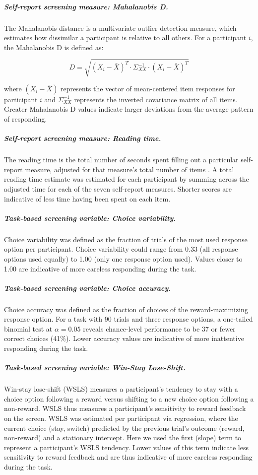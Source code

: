 \documentclass[a4paper,notitlepage,12pt]{article}
\begin{document}
\subparagraph{Self-report screening measure: Mahalanobis D.} The Mahalanobis distance is a multivariate outlier detection measure, which estimates how dissimilar a participant is relative to all others. For a participant $i$, the Mahalanobis D is defined as:

\begin{equation*}
    D = \sqrt{(X_i - \bar{X})^T \cdot \Sigma^{-1}_{XX} \cdot (X_i - \bar{X})^T }
\end{equation*}

where $(X_i - \bar{X})$ represents the vector of mean-centered item responses for participant $i$ and $\Sigma^{-1}_{XX}$ represents the inverted covariance matrix of all items. Greater Mahalanobis D values indicate larger deviations from the average pattern of responding.

\subparagraph{Self-report screening measure: Reading time.} The reading time is the total number of seconds spent filling out a particular self-report measure, adjusted for that measure's total number of items \cite{ophir2020turker}. A total reading time estimate was estimated for each participant by summing across the adjusted time for each of the seven self-report measures. Shorter scores are indicative of less time having been spent on each item.

\subparagraph{Task-based screening variable: Choice variability.} Choice variability was defined as the fraction of trials of the most used response option per participant. Choice variability could range from 0.33 (all response options used equally) to 1.00 (only one response option used). Values closer to 1.00 are indicative of more careless responding during the task.  

\subparagraph{Task-based screening variable: Choice accuracy.} Choice accuracy was defined as the fraction of choices of the reward-maximizing response option. For a task with 90 trials and three response options, a one-tailed binomial test at $\alpha=0.05$ reveals chance-level performance to be 37 or fewer correct choices (41\%). Lower accuracy values are indicative of more inattentive responding during the task.

\subparagraph{Task-based screening variable: Win-Stay Lose-Shift.} Win-stay lose-shift (WSLS) measures a participant's tendency to stay with a choice option following a reward versus shifting to a new choice option following a non-reward. WSLS thus measures a participant's sensitivity to reward feedback on the screen. WSLS was estimated per participant via regression, where the current choice (stay, switch) predicted by the previous trial's outcome (reward, non-reward) and a stationary intercept. Here we used the first (slope) term to represent a participant's WSLS tendency. Lower values of this term indicate less sensitivity to reward feedback and are thus indicative of more careless responding during the task.
\end{document}
